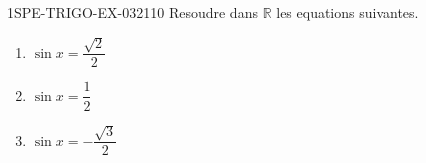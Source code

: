 \begin{exercice}{1SPE-TRIGO-EX-032}{1}{10}
Resoudre dans $\mathbb{R}$ les equations suivantes.
\begin{enumerate}
  \item $\sin x = \dfrac{\sqrt{2}}{2}$
  \item $\sin x = \dfrac{1}{2}$
  \item $\sin x = -\dfrac{\sqrt{3}}{2}$
\end{enumerate}
\end{exercice}
